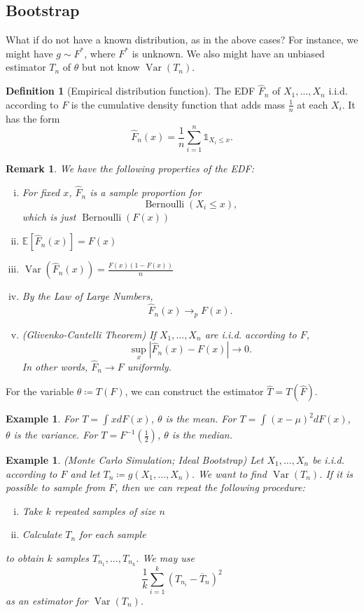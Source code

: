 \documentclass{tufte-handout}
\newcommand*\E{\mathbb{E}}
\newtheorem{rmk}[thm]{Remark}
\newtheorem{ex}[thm]{Example}
\theoremstyle{definition}
\newtheorem{defn}[thm]{Definition}
\begin{document}
\subsection{Bootstrap}

What if do not have a known distribution, as in the above cases? For instance, we might have $g \sim F^*$, where $F^*$ is unknown. We also might have an unbiased estimator $T_n$ of $\theta$ but not know $\operatorname{Var}(T_n)$.

\begin{defn}[Empirical distribution function]
	The EDF $\hat{F}_n$ of $X_1,\ldots,X_n$ i.i.d. according to $F$ is the cumulative density function that adds mass $\frac{1}{n}$ at each $X_i$. It has the form \[
		\hat{F}_n(x) = \frac{1}{n} \sum\limits_{i=1}^{n} \mathds{1}_{X_i \le x}
	.\] 
\end{defn}

\begin{rmk}
	We have the following properties of the EDF:
	\begin{enumerate}[(i)]
		\item For fixed $x$, $\hat{F}_n$ is a sample proportion for \[\operatorname{Bernoulli}(X_i \le x),\] which is just $\operatorname{Bernoulli}(F(x))$
		\item $\E\left[\hat{F}_n(x)\right] = F(x)$
		\item $\operatorname{Var}\left( \hat{F}_n(x) \right) = \frac{F(x) \left( 1-F(x) \right)}{n}$
		\item By the Law of Large Numbers, \[
			\hat{F}_n(x) \to_p F(x)
		.\] 
		\item (Glivenko-Cantelli Theorem) If $X_1,\ldots,X_n$ are i.i.d. according to $F$, \[
			\sup\limits_x \left| \hat{F}_n(x) - F(x) \right|\to 0
		.\] In other words, $\hat{F}_n \to F$ uniformly.
	\end{enumerate}
\end{rmk}

For the variable $\theta \coloneqq T(F)$, we can construct the estimator $\hat{T} = T(\hat{F})$.

\begin{ex}
	For $T = \int_{}^{} x dF(x) $, $\theta$ is the mean. For $T = \int_{} (x-\mu)^2 dF(x) $, $\theta$ is the variance. For $T = F^{-1}(\frac{1}{2})$, $\theta$ is the median.
\end{ex}

\begin{ex} (Monte Carlo Simulation; Ideal Bootstrap)
	Let $X_1,\ldots,X_n$ be i.i.d. according to $F$ and let $T_n \coloneqq g(X_1,\ldots,X_n)$. We want to find $\operatorname{Var}(T_n)$. If it is possible to sample from $F$, then we can repeat the following procedure:
	\begin{enumerate}[(i)]
		\item Take $k$ repeated samples of size $n$
		\item Calculate $T_n$ for each sample
	\end{enumerate}	
	to obtain $k$ samples $T_{n_1},\ldots,T_{n_k}$. We may use \[
		\frac{1}{k} \sum\limits_{i=1}^{k} \left( T_{n_i} - \overline{T}_n \right)^2
	\] as an estimator for $\operatorname{Var}\left(T_n\right)$.
\end{ex}
\end{document}
